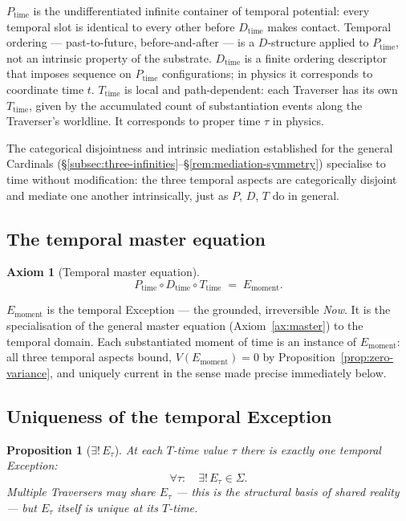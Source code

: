 \documentclass[11pt,a4paper]{article}
\newtheorem{proposition}[theorem]{Proposition}
\theoremstyle{definition}
\newtheorem{axiom}[theorem]{Axiom}
\theoremstyle{remark}
\begin{document}
$P_{\text{time}}$ is the undifferentiated infinite container of temporal potential: every temporal slot is identical to every other before $D_{\text{time}}$ makes contact. Temporal ordering --- past-to-future, before-and-after --- is a $D$-structure applied to $P_{\text{time}}$, not an intrinsic property of the substrate. $D_{\text{time}}$ is a finite ordering descriptor that imposes sequence on $P_{\text{time}}$ configurations; in physics it corresponds to coordinate time $t$. $T_{\text{time}}$ is local and path-dependent: each Traverser has its own $T_{\text{time}}$, given by the accumulated count of substantiation events along the Traverser's worldline. It corresponds to proper time $\tau$ in physics.

The categorical disjointness and intrinsic mediation established for the general Cardinals (\S\ref{subsec:three-infinities}--\S\ref{rem:mediation-symmetry}) specialise to time without modification: the three temporal aspects are categorically disjoint and mediate one another intrinsically, just as $P$, $D$, $T$ do in general.

\subsection{The temporal master equation}

\begin{axiom}[Temporal master equation]\label{ax:temporal-master}
\[
\boxed{\;P_{\text{time}} \circ D_{\text{time}} \circ T_{\text{time}} \;=\; E_{\text{moment}}.\;}
\]
\end{axiom}

$E_{\text{moment}}$ is the temporal Exception --- the grounded, irreversible \emph{Now}. It is the specialisation of the general master equation (Axiom~\ref{ax:master}) to the temporal domain. Each substantiated moment of time is an instance of $E_{\text{moment}}$: all three temporal aspects bound, $V(E_{\text{moment}}) = 0$ by Proposition~\ref{prop:zero-variance}, and uniquely current in the sense made precise immediately below.

\subsection{Uniqueness of the temporal Exception}

\begin{proposition}[$\exists!\,E_{\tau}$]\label{prop:unique-E-tau}
At each $T$-time value $\tau$ there is exactly one temporal Exception:
\[
\forall \tau:\quad \exists!\, E_{\tau} \in \Sigma.
\]
Multiple Traversers may share $E_{\tau}$ --- this is the structural basis of shared reality --- but $E_{\tau}$ itself is unique at its $T$-time.
\end{proposition}
\end{document}
